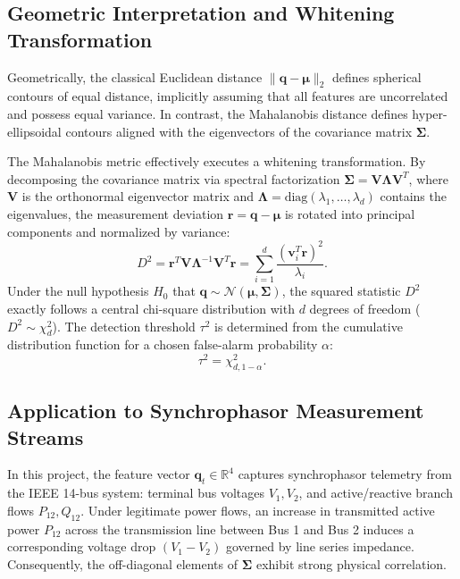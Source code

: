 \documentclass[12pt,a4paper]{report}
\begin{document}
\subsection{Geometric Interpretation and Whitening Transformation}
Geometrically, the classical Euclidean distance $\|\boldsymbol{q} - \boldsymbol{\mu}\|_2$
defines spherical contours of equal distance, implicitly assuming that all features are
uncorrelated and possess equal variance. In contrast, the Mahalanobis distance defines
hyper-ellipsoidal contours aligned with the eigenvectors of the covariance matrix
$\boldsymbol{\Sigma}$.

The Mahalanobis metric effectively executes a whitening transformation. By decomposing the
covariance matrix via spectral factorization $\boldsymbol{\Sigma} = \boldsymbol{V} \boldsymbol{\Lambda} \boldsymbol{V}^T$,
where $\boldsymbol{V}$ is the orthonormal eigenvector matrix and $\boldsymbol{\Lambda} = \text{diag}(\lambda_1, \dots, \lambda_d)$
contains the eigenvalues, the measurement deviation $\boldsymbol{r} = \boldsymbol{q} - \boldsymbol{\mu}$
is rotated into principal components and normalized by variance:
\begin{equation}
D^2 = \boldsymbol{r}^T \boldsymbol{V} \boldsymbol{\Lambda}^{-1} \boldsymbol{V}^T \boldsymbol{r} = \sum_{i=1}^d \frac{(\boldsymbol{v}_i^T \boldsymbol{r})^2}{\lambda_i}.
\end{equation}
Under the null hypothesis $H_0$ that $\boldsymbol{q} \sim \mathcal{N}(\boldsymbol{\mu}, \boldsymbol{\Sigma})$,
the squared statistic $D^2$ exactly follows a central chi-square distribution with $d$ degrees
of freedom ($D^2 \sim \chi^2_d$). The detection threshold $\tau^2$ is determined from the
cumulative distribution function for a chosen false-alarm probability $\alpha$:
\begin{equation}
\tau^2 = \chi^2_{d, 1-\alpha}.
\end{equation}

\subsection{Application to Synchrophasor Measurement Streams}
In this project, the feature vector $\boldsymbol{q}_t \in \mathbb{R}^4$ captures synchrophasor
telemetry from the IEEE 14-bus system: terminal bus voltages $V_1, V_2$, and active/reactive
branch flows $P_{12}, Q_{12}$. Under legitimate power flows, an increase in transmitted active
power $P_{12}$ across the transmission line between Bus 1 and Bus 2 induces a corresponding
voltage drop $(V_1 - V_2)$ governed by line series impedance. Consequently, the off-diagonal
elements of $\boldsymbol{\Sigma}$ exhibit strong physical correlation.
\end{document}
